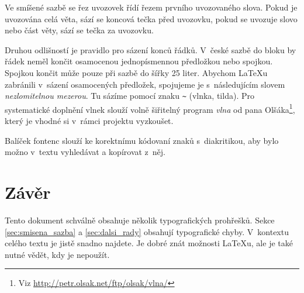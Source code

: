 \documentclass[twocolumn,a4paper,10pt]{article}
\begin{document}
Ve smíšené sazbě se řez uvozovek řídí řezem prvního uvozovaného slova.
Pokud je uvozována celá věta, sází se koncová tečka před uvozovku, pokud se uvozuje slovo nebo část věty, sází se tečka za uvozovku.

Druhou odlišností je pravidlo pro sázení konců řádků.
V~české sazbě do bloku by řádek neměl končit osamocenou jednopísmennou předložkou nebo spojkou.
Spojkou  končit může pouze při sazbě do šířky 25 liter.
Abychom \LaTeX u zabránili v~sázení osamocených předložek, spojujeme je s~následujícím slovem \emph{nezlomitelnou mezerou}.
Tu sázíme pomocí znaku \verb|~| (vlnka, tilda).
Pro systematické doplnění vlnek slouží volně šiřitelný program \emph{vlna} od pana Olšáka\footnote[2]{Viz \url{http://petr.olsak.net/ftp/olsak/vlna/}}, který je vhodné si v~rámci projektu vyzkoušet.

Balíček fontenc slouží ke korektnímu kódovaní znaků s~diakritikou, aby bylo možno v~textu vyhledávat a kopírovat z~něj.


\section{Závěr}

Tento dokument schválně obsahuje několik typografických prohřešků.
Sekce \ref{sec:smisena_sazba} a \ref{sec:dalsi_rady} obsahují typografické chyby.
V~kontextu celého textu je jistě snadno najdete.
Je dobré znát možnosti \LaTeX u, ale je také nutné vědět, kdy je nepoužít.
\end{document}
